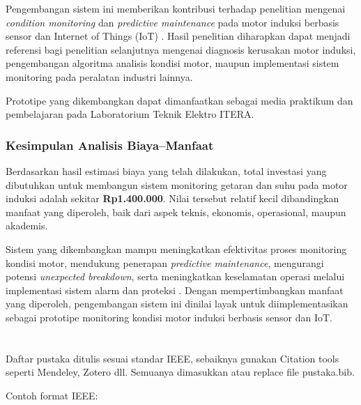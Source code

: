\documentclass{elsinta}
\begin{document}
Pengembangan sistem ini memberikan kontribusi terhadap penelitian mengenai \textit{condition monitoring} dan \textit{predictive maintenance} pada motor induksi berbasis sensor dan Internet of Things (IoT) \cite{Bahga2014,Jardine2006}. Hasil penelitian diharapkan dapat menjadi referensi bagi penelitian selanjutnya mengenai diagnosis kerusakan motor induksi, pengembangan algoritma analisis kondisi motor, maupun implementasi sistem monitoring pada peralatan industri lainnya.

Prototipe yang dikembangkan dapat dimanfaatkan sebagai media praktikum dan pembelajaran pada Laboratorium Teknik Elektro ITERA.

\subsubsection{Kesimpulan Analisis Biaya--Manfaat}

Berdasarkan hasil estimasi biaya yang telah dilakukan, total investasi yang dibutuhkan untuk membangun sistem monitoring getaran dan suhu pada motor induksi adalah sekitar \textbf{Rp1.400.000}. Nilai tersebut relatif kecil dibandingkan manfaat yang diperoleh, baik dari aspek teknis, ekonomis, operasional, maupun akademis.

Sistem yang dikembangkan mampu meningkatkan efektivitas proses monitoring kondisi motor, mendukung penerapan \textit{predictive maintenance}, mengurangi potensi \textit{unexpected breakdown}, serta meningkatkan keselamatan operasi melalui implementasi sistem alarm dan proteksi \cite{Jardine2006, Filho2025}. Dengan mempertimbangkan manfaat yang diperoleh, pengembangan sistem ini dinilai layak untuk diimplementasikan sebagai prototipe monitoring kondisi motor induksi berbasis sensor dan IoT.


\section{\ReferencesTitle}
Daftar pustaka ditulis sesuai standar IEEE, sebaiknya gunakan Citation tools seperti Mendeley, Zotero dll. Semuanya dimasukkan atau replace file pustaka.bib.

Contoh format IEEE:  
\renewcommand{\refname}{}      %
\end{document}
